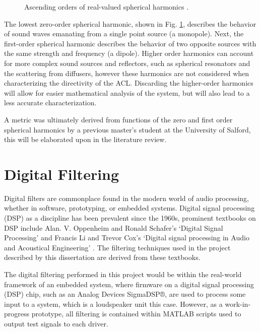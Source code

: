 \documentclass{report}
\begin{document}
\begin{figure}[H]
\begin{minipage}{.59\textwidth}
                \caption{Ascending orders of real-valued spherical harmonics \cite{klippel2016holographic}.}
                \label{klippelSphericalHarms}
            \end{minipage}
        \end{figure}

        The lowest zero-order spherical harmonic, shown in Fig. \ref{klippelSphericalHarms}, describes the behavior of sound waves emanating from a single point source (a monopole).
        Next, the first-order spherical harmonic describes the behavior of two opposite sources with the same strength and frequency (a dipole).
        Higher order harmonics can account for more complex sound sources and reflectors, such as spherical resonators and the scattering from diffusers, however these harmonics are not considered when characterizing the directivity of the ACL.
        Discarding the higher-order harmonics will allow for easier mathematical analysis of the system, but will also lead to a less accurate characterization.

        
        A metric was ultimately derived from functions of the zero and first order spherical harmonics by a previous master's student at the University of Salford, this will be elaborated upon in the literature review.

    \section{Digital Filtering}
        Digital filters are commonplace found in the modern world of audio processing, whether in software, prototyping, or embedded systems.
        Digital signal processing (DSP) as a discipline has been prevalent since the 1960s, prominent textbooks on DSP include Alan. V. Oppenheim and Ronald Schafer's `Digital Signal Processing' \cite{oppenheim1975digital} and Francis Li and Trevor Cox's `Digital signal processing in Audio and Acoustical Engineering' \cite{li2019digital}.
        The filtering techniques used in the project described by this dissertation are derived from these textbooks.

        The digital filtering performed in this project would be within the real-world framework of an embedded system, where firmware on a digital signal processing (DSP) chip, such as an Analog Devices SigmaDSP®, are used to process some input to a system, which is a loudspeaker unit this case.
        However, as a work-in-progress prototype, all filtering is contained within MATLAB scripts used to output test signals to each driver.
\end{document}
